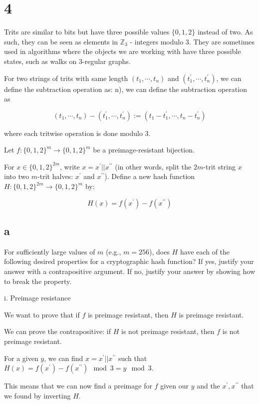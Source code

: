 \documentclass[11pt]{article}
\begin{document}
\section{4}

Trits are similar to bits but have three possible values $\{0, 1, 2\}$ instead of two. As such, they can be seen as elements in $\mathbb{Z}_3$ - integers modulo $3$. They are sometimes used in algorithms where the objects we are working with have three possible states, such as walks on 3-regular graphs. 

For two strings of trits with same length $(t_1, \cdots , t_n)$ and $(t^\prime_1, \cdots , t^\prime_n)$, we can define the subtraction operation as:
n), we can deﬁne the subtraction operation as

$$ (t_1, \cdots , t_n) - (t^\prime_1, \cdots , t^\prime_n) := (t_1 - t^\prime_1, \cdots , t_n - t^\prime_n) $$

where each tritwise operation is done modulo $3$.

Let $f : \{0, 1, 2\}^m \rightarrow \{0, 1, 2\}^m$ be a preimage-resistant bijection.

For $x \in \{0, 1, 2\}^{2m}$, write $x = x^\prime || x^{\prime \prime}$ (in other words, split the $2m$-trit string $x$ into two $m$-trit halves: $x^\prime$ and $x^{\prime\prime}$). Deﬁne a new hash function $H : \{0, 1, 2\}^{2m} \rightarrow \{0, 1, 2\}^m$ by:

$$ H(x) = f(x^\prime) - f(x^{\prime\prime}) $$

\subsection{a}

For suﬃciently large values of $m$ (e.g., $m = 256$), does $H$ have each of the following desired properties for a cryptographic hash function? If yes, justify your answer with a contrapositive argument. If no, justify your answer by showing how to break the property.

i. Preimage resistance

We want to prove that if $f$ is preimage resistant, then $H$ is preimage resistant.

We can prove the contrapositive: if $H$ is not preimage resistant, then $f$ is not preimage resistant.

For a given $y$, we can find $x = x^\prime || x^{\prime\prime}$ such that $H(x) = f(x^\prime) - f(x^{\prime\prime}) \mod 3 = y \mod 3$.

This means that we can now find a preimage for $f$ given our $y$ and the $x^\prime, x^{\prime\prime}$ that we found by inverting $H$.
\end{document}
